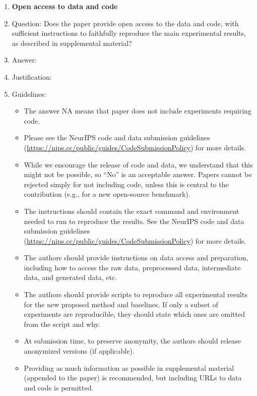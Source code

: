 \documentclass{article}
\begin{document}
\begin{enumerate}
\item {\bf Open access to data and code}
    \item[] Question: Does the paper provide open access to the data and code, with sufficient instructions to faithfully reproduce the main experimental results, as described in supplemental material?
    \item[] Answer: \answerTODO{} %
    \item[] Justification: \justificationTODO{}
    \item[] Guidelines:
    \begin{itemize}
        \item The answer NA means that paper does not include experiments requiring code.
        \item Please see the NeurIPS code and data submission guidelines (\url{https://nips.cc/public/guides/CodeSubmissionPolicy}) for more details.
        \item While we encourage the release of code and data, we understand that this might not be possible, so “No” is an acceptable answer. Papers cannot be rejected simply for not including code, unless this is central to the contribution (e.g., for a new open-source benchmark).
        \item The instructions should contain the exact command and environment needed to run to reproduce the results. See the NeurIPS code and data submission guidelines (\url{https://nips.cc/public/guides/CodeSubmissionPolicy}) for more details.
        \item The authors should provide instructions on data access and preparation, including how to access the raw data, preprocessed data, intermediate data, and generated data, etc.
        \item The authors should provide scripts to reproduce all experimental results for the new proposed method and baselines. If only a subset of experiments are reproducible, they should state which ones are omitted from the script and why.
        \item At submission time, to preserve anonymity, the authors should release anonymized versions (if applicable).
        \item Providing as much information as possible in supplemental material (appended to the paper) is recommended, but including URLs to data and code is permitted.
    \end{itemize}



\end{enumerate}
\end{document}

